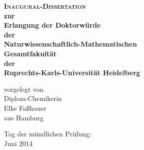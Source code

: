 \documentclass{scrartcl}
\begin{document}
\begin{center}
 \huge
 \textbf{\textsc{Inaugural-Dissertation}\\[5ex]
 \LARGE \textsf{zur\\ Erlangung der Doktorwürde\\
        der\\ Naturwissenschaftlich-Mathematischen\\
        Gesamtfakultät\\
        der\\
        Ruprechts-Karls-Universität
        Heidelberg}}


\vfill
\Large
vorgelegt von\\[2ex]
Diplom-Chemikerin\\
Elke Faßhauer\\[2ex]
aus Hamburg

\vspace{5ex}
Tag der mündlichen Prüfung:\\
 Juni 2014

\end{center}
\end{document}
